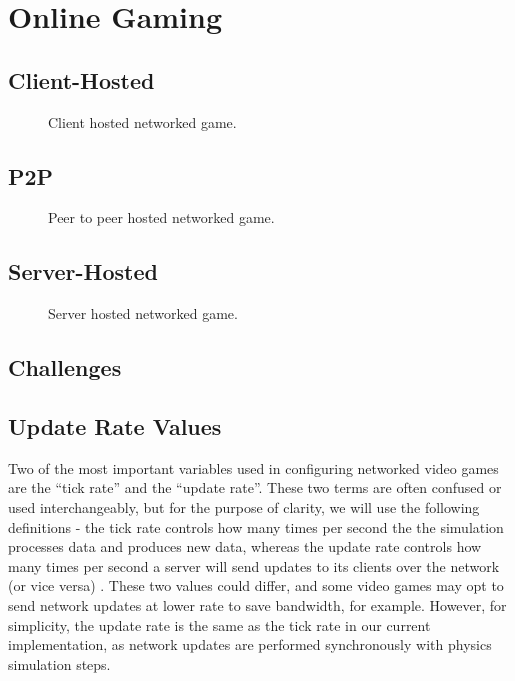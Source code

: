 \section{Online Gaming}

\subsection{Client-Hosted}

\begin{figure}
	\centering
	
	\caption{Client hosted networked game.}
\end{figure}

\subsection{P2P}

\begin{figure}
	\centering
	
	\caption{Peer to peer hosted networked game.}
\end{figure}

\subsection{Server-Hosted}

\begin{figure}
	\centering
	
	\caption{Server hosted networked game.}
\end{figure}

\subsection{Challenges}

\subsection{Update Rate Values} \label{update-rate-test-values}

Two of the most important variables used in configuring networked video games are the ``tick rate'' and the ``update rate''. These two terms are often confused or used interchangeably, but for the purpose of clarity, we will use the following definitions - the tick rate controls how many times per second the the simulation processes data and produces new data, whereas the update rate controls how many times per second a server will send updates to its clients over the network (or vice versa) \cite{NetcodeBattlenonsense}. These two values could differ, and some video games may opt to send network updates at lower rate to save bandwidth, for example. However, for simplicity, the update rate is the same as the tick rate in our current implementation, as network updates are performed synchronously with physics simulation steps.

